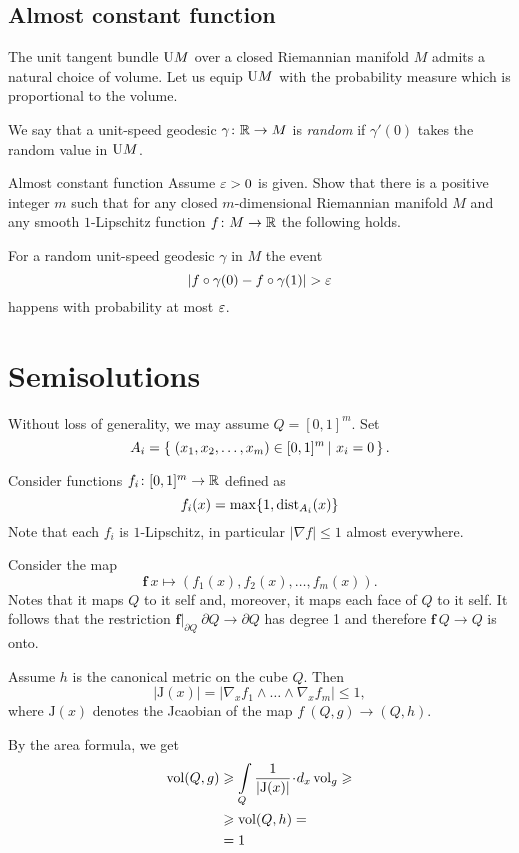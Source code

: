 \subsection*{Almost constant function}

The unit tangent bundle $\mathrm{U} M$ over a closed Riemannian manifold $M$
admits a natural choice of volume.
Let us equip $\mathrm{U} M$ with the probability measure which is proportional to the volume.

We say that a unit-speed geodesic $\gamma\colon\mathbb{R}\to M$ is \emph{random}
if $\gamma'(0)$ takes the random value in $\mathrm{U} M$.

\begin{pr}{}{Almost constant function}\label{Almost constant function}
Assume $\varepsilon>0$ is given.
Show that there is a positive integer $m$ such that
for any closed $m$-dimensional Riemannian manifold $M$
and any smooth $1$-Lipschitz function $f\colon M\to\mathbb{R}$ the following holds.

For a random unit-speed geodesic $\gamma$ in $M$ 
the event 
\[|f\circ\gamma(0)-f\circ\gamma(1)|>\eps\]
happens with probability at most $\varepsilon$.
\end{pr}



\section*{Semisolutions}

Without loss of generality, we may assume  $Q=[0,1]^m$.
Set 
\[A_i=\set{(x_1,x_2,\dots,x_m)\in[0,1]^m}{x_i=0}.\]

Consider functions $f_i\colon[0,1]^m\to\mathbb{R}$ defined as
$$f_i(x)=\max\{1,\operatorname{\rm dist}_{A_i}(x)\}$$
Note that each $f_i$ is $1$-Lipschitz, 
in particular $|\nabla f|\le 1$ almost everywhere.

Consider the map
\[\bm{f}\:x\mapsto(f_1(x),f_2(x),\dots,f_m(x)).\]
Notes that it maps $Q$ to it self
and, moreover, it maps each face of $Q$ to it self.
It follows that the restriction $\bm{f}|_{\partial Q}\:\partial Q\to \partial Q$ has degree 1 and therefore 
$\bm{f}\:Q\to Q$ is onto.

Assume $h$ is the canonical metric on the cube $Q$.
Then 
\[|\mathrm{J}(x)|=|\nabla_x f_1\wedge\dots\wedge\nabla_xf_m|\le 1,\]
where $\mathrm{J}(x)$ denotes the Jcaobian of the map $f\:(Q,g)\to (Q,h)$.

By the area formula, we get 
\begin{align*}
\vol(Q,g)
&\ge \int\limits_Q\frac1{|\mathrm{J}(x)|}\cdot d_x\vol_g\ge
\\
&\ge\vol(Q,h)=\\
&=1
\end{align*}

